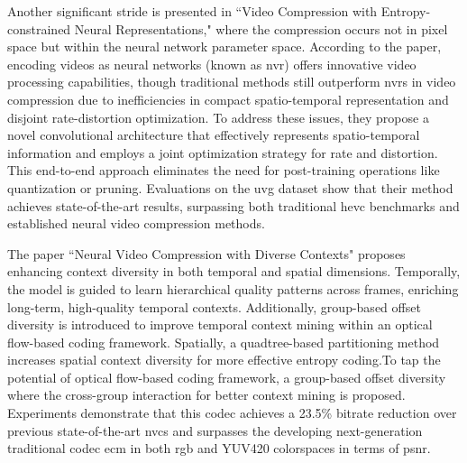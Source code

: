 \documentclass{ioereport}
\begin{document}
Another significant stride is presented in ``Video Compression with Entropy-constrained Neural Representations," \cite{Gomes_2023_CVPR} where the compression occurs not in pixel space but within the neural network parameter space. According to the paper, encoding videos as neural networks (known as \gls{nvr}) offers innovative video processing capabilities, though traditional methods still outperform \gls{nvr}s in video compression due to inefficiencies in compact spatio-temporal representation and disjoint rate-distortion optimization. To address these issues, they propose a novel convolutional architecture that effectively represents spatio-temporal information and employs a joint optimization strategy for rate and distortion. This end-to-end approach eliminates the need for post-training operations like quantization or pruning. Evaluations on the \gls{uvg} dataset show that their method achieves state-of-the-art results, surpassing both traditional \gls{hevc} benchmarks and established neural video compression methods. 

The paper ``Neural Video Compression with Diverse Contexts" \cite{li2023neural} proposes enhancing context diversity in both temporal and spatial dimensions. Temporally, the model is guided to learn hierarchical quality patterns across frames, enriching long-term, high-quality temporal contexts. Additionally, group-based offset diversity is introduced to improve temporal context mining within an optical flow-based coding framework. Spatially, a quadtree-based partitioning method increases spatial context diversity for more effective entropy coding.To tap the potential of optical flow-based coding framework, a group-based offset diversity where the cross-group interaction for better context mining is proposed. Experiments demonstrate that this \gls{codec} achieves a 23.5\% bitrate reduction over previous state-of-the-art \gls{nvc}s and surpasses the developing next-generation traditional \gls{codec} \gls{ecm} in both \gls{rgb} and YUV420 colorspaces in terms of \gls{psnr}. 
\end{document}
